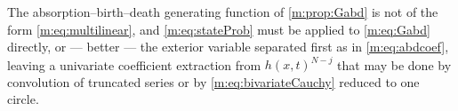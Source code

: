 The absorption--birth--death generating function of \cref{m:prop:Gabd} is not of the
form \cref{m:eq:multilinear}, and \cref{m:eq:stateProb} must be applied to
\cref{m:eq:Gabd} directly, or --- better --- the exterior variable separated first
as in \cref{m:eq:abdcoef}, leaving a univariate coefficient extraction from
$h(x,t)^{N-j}$ that may be done by convolution of truncated series or by
\cref{m:eq:bivariateCauchy} reduced to one circle.

\renewcommand{\thesection}{\thechapter.\arabic{section}}
